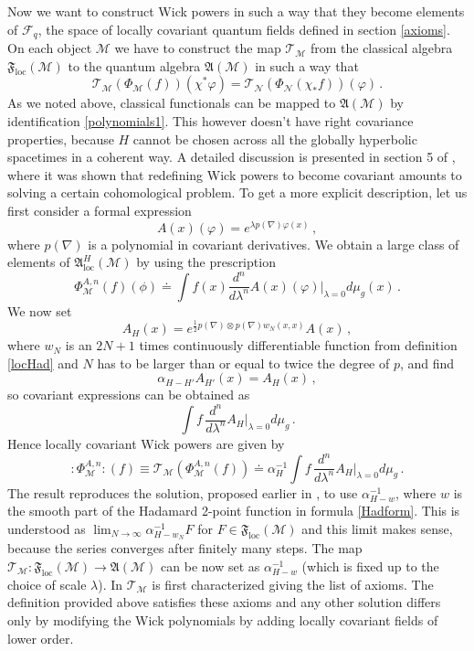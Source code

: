 \documentclass[11pt]{article}
\newcommand{\fA}{\mathfrak{A}}
\newcommand{\F}{\mathfrak{F}}
\newcommand{\Fcal}{\mathcal{F}}
\newcommand{\Ncal}{\mathcal{N}}
\newcommand{\Mcal}{\mathcal{M}}
\newcommand{\Tcal}{\mathcal{T}}
\newcommand{\loc}{\mathrm{loc}}
\newcommand{\al}{\alpha}
\newcommand{\la}{\lambda}
\newcommand{\ph}{\varphi}
\newcommand{\TT}{\Tcal}
\newcommand{\sst}[1]{\scriptscriptstyle{#1}}  %
\newcommand{\minus}{\sst{-1}}   %
\newcommand{\1}{\mathds{1}}                         %
\newcommand{\be}{\begin{equation}}
\newcommand{\ee}{\end{equation}}
\begin{document}
{{Now we want to construct Wick powers in such a way that they become elements of  $\Fcal_q$, the space of locally covariant quantum fields defined in section \ref{axioms}. On each object $\Mcal$ we have to construct the map ${\TT}_\Mcal$ from the classical algebra $\F_\loc(\Mcal)$ to the quantum algebra $\fA(\Mcal)$ in such a way that
\be
\label{covariance}
{\TT}_{\Mcal}(\Phi_{\Mcal}(f))(\chi^*\ph)={\TT}_{\Ncal}(\Phi_{\Ncal}(\chi_*f))(\ph)\,.
\ee
As we noted above, classical functionals can be mapped  to $\fA(\Mcal)$ by identification \eqref{polynomials1}. This however doesn't have right covariance properties, because $H$ cannot be chosen across all the globally hyperbolic spacetimes in a coherent way. A detailed discussion is presented in section 5 of \cite{BFV}, where it was shown that redefining Wick powers to become covariant amounts to solving a certain cohomological problem. To get a more explicit description, let us first consider a formal expression 
\[
A(x)(\ph)=e^{\la p(\nabla)\ph(x)}\,,
\]
where $p(\nabla)$ is a polynomial in covariant derivatives. We obtain a large class of elements of $\fA^{\sst H}_{\loc}(\Mcal)$ by using the prescription
\[
\Phi^{A,n}_{\Mcal}(f)(\phi)\doteq\int f(x)\frac{d^n}{d\la^n}A(x)(\ph)\big|_{\la=0}d\mu_g(x)\,.
\]
We now set
\[
A_H(x)=e^{\frac12p(\nabla)\otimes p(\nabla)w_N(x,x)}A(x)\,,
\]
where $w_N$ is an $2N + 1$ times continuously
differentiable function from definition \ref{locHad} and $N$ has to be larger than or equal to twice the degree of $p$, and find
\[
\al_{H-H'}A_{H'}(x)=A_H(x)\,,
\]
so covariant expressions can be obtained as
\[
\int f\,\frac{d^n}{d\la^n}A_H \big|_{\la=0}d\mu_g\,.
\]
Hence locally covariant Wick powers are given by
\[
:\Phi^{A,n}_{\Mcal}:(f)\equiv {\TT}_{\Mcal}(\Phi^{A,n}_{\Mcal}(f)) \doteq \al_H^{\minus} \int f\,\frac{d^n}{d\la^n}A_H \big|_{\la=0}d\mu_g\,.
\]
The result reproduces the solution, proposed earlier in \cite{HW}, to use $\al^{-1}_{H-w}$, where $w$ is the smooth part of the Hadamard 2-point function in formula \eqref{Hadform}. This is understood as $\lim_{N\rightarrow \infty} \al^{\minus}_{H-w_N}F$ for $F\in\F_{\loc}(\Mcal)$ and this limit makes sense, because the series converges after finitely many steps. The map ${\TT}_\Mcal:\F_\loc(\Mcal)\rightarrow\fA(\Mcal)$ can be now set as $\al^{-1}_{H-w}$ (which is fixed up to the choice of scale $\la$).  In \cite{HW}  ${\TT}_\Mcal$ is first characterized giving the list of axioms. The definition provided above satisfies these axioms and any other solution differs only by modifying the Wick polynomials by adding locally covariant fields of lower order.
}}
\end{document}
